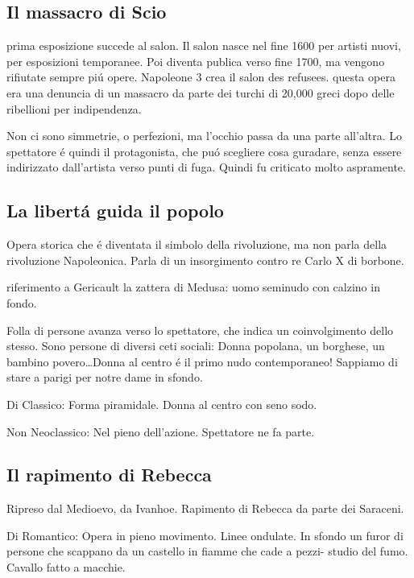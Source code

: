 \documentclass{article}
\begin{document}
\subsection{Il massacro di Scio}
prima esposizione succede al salon. Il salon nasce nel fine 1600 per artisti nuovi, per esposizioni temporanee. Poi diventa publica verso fine 1700, ma vengono rifiutate sempre piú opere. Napoleone 3 crea il salon des refusees.
questa opera era una denuncia di un massacro da parte dei turchi di 20,000 greci dopo delle ribellioni per indipendenza.

Non ci sono simmetrie, o perfezioni, ma l'occhio passa da una parte all'altra. Lo spettatore é quindi il protagonista, che puó scegliere cosa guradare, senza essere indirizzato dall'artista verso punti di fuga. Quindi fu criticato molto aspramente.
\subsection{La libertá guida il popolo}
Opera storica che é diventata il simbolo della rivoluzione, ma non parla della rivoluzione Napoleonica. Parla di un insorgimento contro re Carlo X di borbone.

riferimento a Gericault la zattera di Medusa: uomo seminudo con calzino in fondo.

Folla di persone avanza verso lo spettatore, che indica un coinvolgimento dello stesso. Sono persone di diversi ceti sociali: Donna popolana, un borghese, un bambino povero\dots Donna al centro é il primo nudo contemporaneo! Sappiamo di stare a parigi per notre dame in sfondo.

Di Classico: Forma piramidale. Donna al centro con seno sodo.

Non Neoclassico: Nel pieno dell'azione. Spettatore ne fa parte.
\subsection{Il rapimento di Rebecca}
Ripreso dal Medioevo, da Ivanhoe. Rapimento di Rebecca da parte dei Saraceni.

Di Romantico: Opera in pieno movimento. Linee ondulate. In sfondo un furor di persone che scappano da un castello in fiamme che cade a pezzi- studio del fumo. Cavallo fatto a macchie. 
\end{document}
